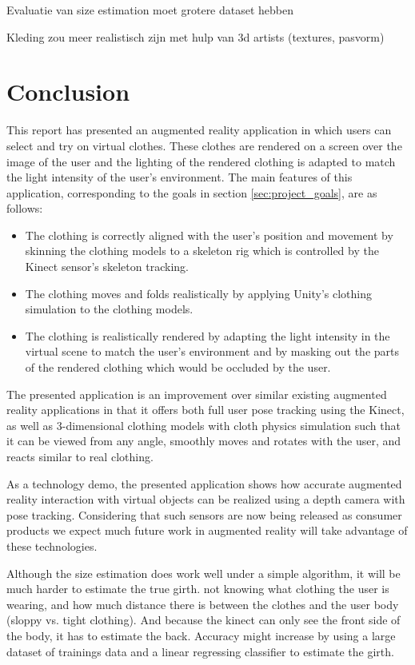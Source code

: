\documentclass[a4paper]{article}
\begin{document}
Evaluatie van size estimation moet grotere dataset hebben

Kleding zou meer realistisch zijn met hulp van 3d artists (textures, pasvorm)

\section{Conclusion}
\label{sec:conclusion}

This report has presented an augmented reality application in which users can select and try on virtual clothes. These clothes are rendered on a screen over the image of the user and the lighting of the rendered clothing is adapted to match the light intensity of the user's environment. The main features of this application, corresponding to the goals in section \ref{sec:project_goals}, are as follows:
\begin{itemize}
\item The clothing is correctly aligned with the user's position and movement by skinning the clothing models to a skeleton rig which is controlled by the Kinect sensor's skeleton tracking.
\item The clothing moves and folds realistically by applying Unity's clothing simulation to the clothing models.
\item The clothing is realistically rendered by adapting the light intensity in the virtual scene to match the user's environment and by masking out the parts of the rendered clothing which would be occluded by the user.
\end{itemize}

The presented application is an improvement over similar existing augmented reality applications in that it offers both full user pose tracking using the Kinect, as well as 3-dimensional clothing models with cloth physics simulation such that it can be viewed from any angle, smoothly moves and rotates with the user, and reacts similar to real clothing.

As a technology demo, the presented application shows how accurate augmented reality interaction with virtual objects can be realized using a depth camera with pose tracking. Considering that such sensors are now being released as consumer products we expect much future work in augmented reality will take advantage of these technologies.

Although the size estimation does work well under a simple algorithm, it will be much harder to estimate the true girth. not knowing what clothing the user is wearing, and how much distance there is between the clothes and the user body (sloppy vs. tight clothing). And because the kinect can only see the front side of the body, it has to estimate the back. 
Accuracy might increase by using a large dataset of trainings data and a linear regressing classifier to estimate the girth.
\end{document}
